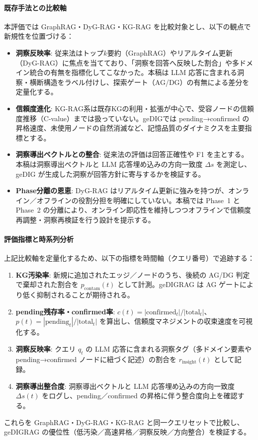 \documentclass[ja=standard,xelatex]{bxjsarticle}
\begin{document}
\paragraph{既存手法との比較軸}
本評価では GraphRAG・DyG-RAG・KG-RAG を比較対象とし、以下の観点で新規性を位置づける：
\begin{itemize}
  \item \textbf{洞察反映率}: 従来法はトップ$k$要約（GraphRAG）やリアルタイム更新（DyG-RAG）に焦点を当てており、「洞察を回答へ反映した割合」や多ドメイン統合の有無を指標化してこなかった。本稿は LLM 応答に含まれる洞察・横断構造をラベル付けし、探索ゲート（AG/DG）の有無による差分を定量化する。
  \item \textbf{信頼度進化}: KG-RAG系は既存KGの利用・拡張が中心で、受容ノードの信頼度推移（C-value）までは扱っていない。geDIGでは pending→confirmed の昇格速度、未使用ノードの自然消滅など、記憶品質のダイナミクスを主要指標とする。
  \item \textbf{洞察導出ベクトルとの整合}: 従来法の評価は回答正確性や F1 を主とする。本稿は洞察導出ベクトルと LLM 応答埋め込みの方向一致度 $\Delta s$ を測定し、geDIG が生成した洞察が回答方針に寄与するかを検証する。
  \item \textbf{Phase分離の恩恵}: DyG-RAG はリアルタイム更新に強みを持つが、オンライン／オフラインの役割分担を明確にしていない。本稿では Phase~1 と Phase~2 の分離により、オンライン即応性を維持しつつオフラインで信頼度再調整・洞察再検証を行う設計を提示する。
\end{itemize}

\paragraph{評価指標と時系列分析}
上記比較軸を定量化するため、以下の指標を時間軸（クエリ番号）で追跡する：
\begin{enumerate}[label=(E\arabic*)]
  \item \textbf{KG汚染率}: 新規に追加されたエッジ／ノードのうち、後続の AG/DG 判定で棄却された割合を $p_{\mathrm{contam}}(t)$ として計測。geDIGRAG は AG ゲートにより低く抑制されることが期待される。
  \item \textbf{pending残存率・confirmed率}: $c(t)=|\text{confirmed}_t|/|\text{total}_t|$、$p(t)=|\text{pending}_t|/|\text{total}_t|$ を算出し、信頼度マネジメントの収束速度を可視化する。
  \item \textbf{洞察反映率}: クエリ $q_t$ の LLM 応答に含まれる洞察タグ（多ドメイン要素や pending→confirmed ノードに紐づく記述）の割合を $r_{\mathrm{insight}}(t)$ として記録。
  \item \textbf{洞察導出整合度}: 洞察導出ベクトルと LLM 応答埋め込みの方向一致度 $\Delta s(t)$ をログし、pending／confirmed の昇格に伴う整合度向上を確認する。
\end{enumerate}
これらを GraphRAG・DyG-RAG・KG-RAG と同一クエリセットで比較し、geDIGRAG の優位性（低汚染／高速昇格／洞察反映／方向整合）を検証する。
\end{document}
